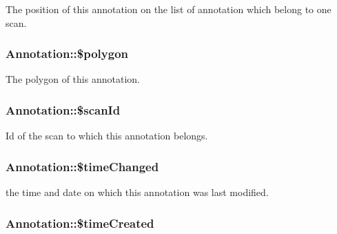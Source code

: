 \label{classAnnotation_a2b06cc7e7fc220f58b94f45cb89cd223}
The position of this annotation on the list of annotation which belong to one scan. \hypertarget{classAnnotation_a6a9416473fa3c1a8f071d8303fcf2093}{
\subsubsection[{\$polygon}]{\setlength{\rightskip}{0pt plus 5cm}Annotation::\$polygon}}
\label{classAnnotation_a6a9416473fa3c1a8f071d8303fcf2093}
The polygon of this annotation. \hypertarget{classAnnotation_ab056a07bc1b1f5c3df2c08dadfaf9396}{
\subsubsection[{\$scanId}]{\setlength{\rightskip}{0pt plus 5cm}Annotation::\$scanId}}
\label{classAnnotation_ab056a07bc1b1f5c3df2c08dadfaf9396}
Id of the scan to which this annotation belongs. \hypertarget{classAnnotation_abb6ccb1464aaa142027c645658e25915}{
\subsubsection[{\$timeChanged}]{\setlength{\rightskip}{0pt plus 5cm}Annotation::\$timeChanged}}
\label{classAnnotation_abb6ccb1464aaa142027c645658e25915}
the time and date on which this annotation was last modified. \hypertarget{classAnnotation_ac3fbdd99078ea6e158999df4ea336257}{
\subsubsection[{\$timeCreated}]{\setlength{\rightskip}{0pt plus 5cm}Annotation::\$timeCreated}}
\label{classAnnotation_ac3fbdd99078ea6e158999df4ea336257}
